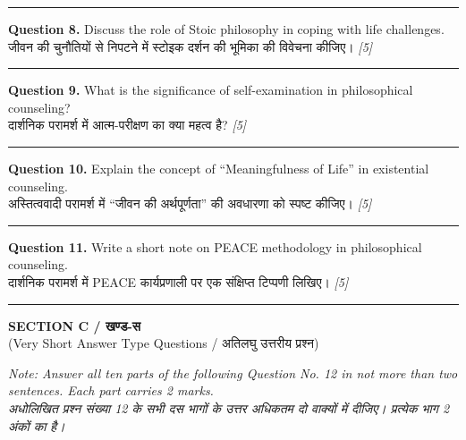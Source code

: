 \documentclass[11pt,a4paper]{article}
\newcommand{\pts}[1]{\hfill \textit{[#1]}}
\begin{document}
\medskip\rule{\linewidth}{0.2pt}\medskip

\noindent \textbf{Question 8.} Discuss the role of Stoic philosophy in coping with life challenges.\\[1pt]
जीवन की चुनौतियों से निपटने में स्टोइक दर्शन की भूमिका की विवेचना कीजिए। \pts{5}

\medskip\rule{\linewidth}{0.2pt}\medskip

\noindent \textbf{Question 9.} What is the significance of self-examination in philosophical counseling?\\[1pt]
दार्शनिक परामर्श में आत्म-परीक्षण का क्या महत्व है? \pts{5}

\medskip\rule{\linewidth}{0.2pt}\medskip

\noindent \textbf{Question 10.} Explain the concept of ``Meaningfulness of Life'' in existential counseling.\\[1pt]
अस्तित्ववादी परामर्श में ``जीवन की अर्थपूर्णता'' की अवधारणा को स्पष्ट कीजिए। \pts{5}

\medskip\rule{\linewidth}{0.2pt}\medskip

\noindent \textbf{Question 11.} Write a short note on PEACE methodology in philosophical counseling.\\[1pt]
दार्शनिक परामर्श में PEACE कार्यप्रणाली पर एक संक्षिप्त टिप्पणी लिखिए। \pts{5}

\bigskip
\rule{\linewidth}{0.2pt}
\bigskip

\begin{center}
  {\large\bfseries SECTION C / खण्ड-स}\\[2pt]
  {\normalsize (Very Short Answer Type Questions / अतिलघु उत्तरीय प्रश्न)}
\end{center}

\noindent \textit{Note: Answer all ten parts of the following Question No. 12 in not more than two sentences. Each part carries 2 marks.}\\[2pt]
\noindent \textit{अधोलिखित प्रश्न संख्या 12 के सभी दस भागों के उत्तर अधिकतम दो वाक्यों में दीजिए। प्रत्येक भाग 2 अंकों का है।}

\bigskip
\end{document}
